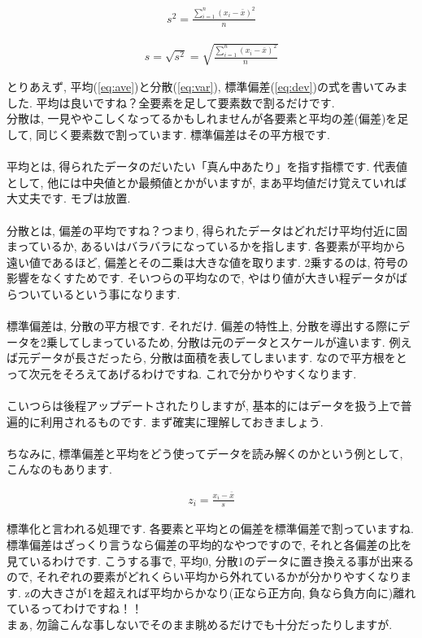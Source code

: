 \documentclass[11pt,a4paper]{jreport}
\begin{document}
\begin{eqnarray}
\label{eq:var}
s^2 = \frac{\sum_{i=1}^{n} (x_i - \bar{x})^2}{n}
\end{eqnarray}

\begin{eqnarray}
\label{eq:dev}
s = \sqrt{s^2} = \sqrt{\frac{\sum_{i=1}^{n} (x_i - \bar{x})^2}{n}}
\end{eqnarray}

とりあえず, 平均(\ref{eq:ave})と分散(\ref{eq:var}), 標準偏差(\ref{eq:dev})の式を書いてみました. 平均は良いですね？全要素を足して要素数で割るだけです.\\
分散は, 一見ややこしくなってるかもしれませんが各要素と平均の差(偏差)を足して, 同じく要素数で割っています. 標準偏差はその平方根です.\\
\\
平均とは, 得られたデータのだいたい「真ん中あたり」を指す指標です. 代表値として, 他には中央値とか最頻値とかがいますが, まあ平均値だけ覚えていれば大丈夫です. モブは放置.\\
\\
分散とは, 偏差の平均ですね？つまり, 得られたデータはどれだけ平均付近に固まっているか, あるいはバラバラになっているかを指します. 各要素が平均から遠い値であるほど, 偏差とその二乗は大きな値を取ります. 2乗するのは, 符号の影響をなくすためです. そいつらの平均なので, やはり値が大きい程データがばらついているという事になります.\\
\\
標準偏差は, 分散の平方根です. それだけ. 偏差の特性上, 分散を導出する際にデータを2乗してしまっているため, 分散は元のデータとスケールが違います. 例えば元データが長さだったら, 分散は面積を表してしまいます. なので平方根をとって次元をそろえてあげるわけですね. これで分かりやすくなります.\\
\\
こいつらは後程アップデートされたりしますが, 基本的にはデータを扱う上で普遍的に利用されるものです. まず確実に理解しておきましょう.\\
\\
ちなみに, 標準偏差と平均をどう使ってデータを読み解くのかという例として, こんなのもあります.

\begin{eqnarray}
z_i = \frac{x_i - \bar{x}}{s}
\end{eqnarray}

標準化と言われる処理です. 各要素と平均との偏差を標準偏差で割っていますね. 標準偏差はざっくり言うなら偏差の平均的なやつですので, それと各偏差の比を見ているわけです. こうする事で, 平均0, 分散1のデータに置き換える事が出来るので, それぞれの要素がどれくらい平均から外れているかが分かりやすくなります. zの大きさが1を超えれば平均からかなり(正なら正方向, 負なら負方向に)離れているってわけですね！！\\
まぁ, 勿論こんな事しないでそのまま眺めるだけでも十分だったりしますが.
\end{document}
